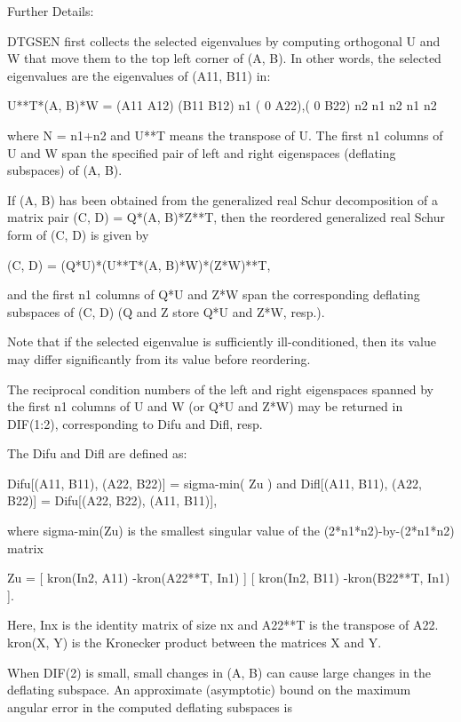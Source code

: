 \begin{DoxyParagraph}{Further Details\+: }
\begin{DoxyVerb}  DTGSEN first collects the selected eigenvalues by computing
  orthogonal U and W that move them to the top left corner of (A, B).
  In other words, the selected eigenvalues are the eigenvalues of
  (A11, B11) in:

              U**T*(A, B)*W = (A11 A12) (B11 B12) n1
                              ( 0  A22),( 0  B22) n2
                                n1  n2    n1  n2

  where N = n1+n2 and U**T means the transpose of U. The first n1 columns
  of U and W span the specified pair of left and right eigenspaces
  (deflating subspaces) of (A, B).

  If (A, B) has been obtained from the generalized real Schur
  decomposition of a matrix pair (C, D) = Q*(A, B)*Z**T, then the
  reordered generalized real Schur form of (C, D) is given by

           (C, D) = (Q*U)*(U**T*(A, B)*W)*(Z*W)**T,

  and the first n1 columns of Q*U and Z*W span the corresponding
  deflating subspaces of (C, D) (Q and Z store Q*U and Z*W, resp.).

  Note that if the selected eigenvalue is sufficiently ill-conditioned,
  then its value may differ significantly from its value before
  reordering.

  The reciprocal condition numbers of the left and right eigenspaces
  spanned by the first n1 columns of U and W (or Q*U and Z*W) may
  be returned in DIF(1:2), corresponding to Difu and Difl, resp.

  The Difu and Difl are defined as:

       Difu[(A11, B11), (A22, B22)] = sigma-min( Zu )
  and
       Difl[(A11, B11), (A22, B22)] = Difu[(A22, B22), (A11, B11)],

  where sigma-min(Zu) is the smallest singular value of the
  (2*n1*n2)-by-(2*n1*n2) matrix

       Zu = [ kron(In2, A11)  -kron(A22**T, In1) ]
            [ kron(In2, B11)  -kron(B22**T, In1) ].

  Here, Inx is the identity matrix of size nx and A22**T is the
  transpose of A22. kron(X, Y) is the Kronecker product between
  the matrices X and Y.

  When DIF(2) is small, small changes in (A, B) can cause large changes
  in the deflating subspace. An approximate (asymptotic) bound on the
  maximum angular error in the computed deflating subspaces is


\end{DoxyVerb}
\end{DoxyParagraph}
